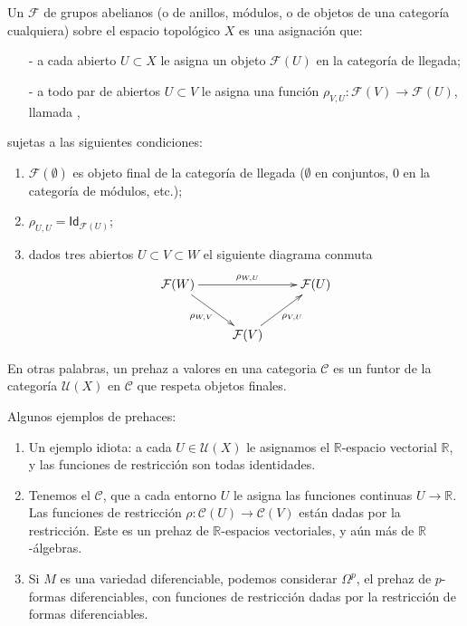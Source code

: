 \documentclass[11pt,fleqn]{article}
\newcommand\RR{\mathbb R}
\renewcommand\to{\longrightarrow}
\newcommand\id{\mathsf{Id}}
\newcommand\U{\mathcal U}
\newcommand\C{\mathcal C}
\newcommand\F{\mathcal F}
\begin{document}
\begin{Definition}
\label{prehaz}
Un  $\F$ de grupos abelianos (o de anillos, módulos, o de objetos de una
categoría cualquiera) sobre el espacio topológico $X$ es una asignación que:
\begin{itemize}
\item[-] a cada abierto $U \subset X$ le asigna un objeto $\F(U)$ en la categoría de
	llegada;
\item[-] a todo par de abiertos $U \subset V$ le asigna una función $\rho_{V,U}: \F(V) \to
	\F(U)$, llamada ,
\end{itemize}
sujetas a las siguientes condiciones:
\begin{enumerate}
\item $\F(\emptyset)$ es objeto final de la categoría de llegada ($\emptyset$ en
	conjuntos, $0$ en la categoría de módulos, etc.);
\item $\rho_{U,U} = \id_{\F(U)}$;
\item dados tres abiertos $U \subset V \subset W$ el siguiente diagrama conmuta
\begin{align*}
\xymatrix{
	\F(W) \ar[dr]_-{\rho_{W,V}} \ar[rr]^-{\rho_{W,U}}& {} & \F(U) \\
	{} & \F(V) \ar[ur]_-{\rho_{V,U}}
}
\end{align*}
\end{enumerate}
En otras palabras, un prehaz a valores en una categoria $\C$ es un funtor de la categoría
$\U(X)$ en $\C$ que respeta objetos finales.
\end{Definition}

\begin{Example}
\label{ejemplos-de-prehaces}
Algunos ejemplos de  prehaces:
\begin{enumerate}
\item Un ejemplo idiota: a cada $U \in \U(X)$ le asignamos el $\RR$-espacio vectorial
	$\RR$, y las funciones de restricción son todas identidades.

\item Tenemos el  $\C$, que a cada entorno $U$ le
	asigna las funciones continuas $U \to \RR$. Las funciones de restricción  $\rho: \C(U)
	\to \C(V)$ están dadas por la restricción. Este es un prehaz de $\RR$-espacios
	vectoriales, y aún más de $\RR$-álgebras.

\item Si $M$ es una variedad diferenciable, podemos considerar $\Omega^p$, el prehaz de
	$p$-formas diferenciables, con funciones de restricción dadas por la restricción de
	formas diferenciables.
\end{enumerate}
\end{Example}
\end{document}
